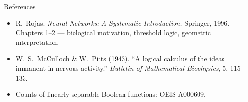\documentclass[aspectratio=169, 11pt]{beamer}
\newcommand{\nosrc}{}       %
\begin{document}
\begin{frame}{References}
  \nosrc
  \footnotesize
  \begin{itemize}\setlength{\itemsep}{3pt}
    \item R.~Rojas. \textit{Neural Networks: A Systematic
          Introduction.} Springer, 1996. Chapters 1--2 ---
          biological motivation, threshold logic, geometric
          interpretation.
    \item W.~S.~McCulloch \& W.~Pitts (1943). ``A logical
          calculus of the ideas immanent in nervous
          activity.'' \textit{Bulletin of Mathematical
          Biophysics}, 5, 115--133.
    \item Counts of linearly separable Boolean functions:
          OEIS A000609.

  \end{itemize}
\end{frame}

\end{document}
